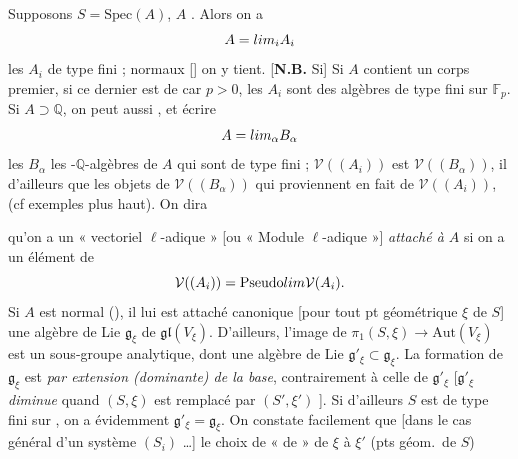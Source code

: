 \documentclass[11pt,a4paper]{article}
\begin{document}
Supposons $S = \mathrm{Spec}(A)$, $A$ 
 \struck{\ill{}} \struck{\ill{} \ill{} \ill{}}.
Alors on a
\[
A = \varinjlim_{i} A_{i}
\]
les $A_{i}$  de type fini ;
 normaux []  on y tient.
[\textbf{N.B.} Si] Si $A$ contient un corps premier, si ce dernier est de
car $p > 0$, les $A_{i}$ sont des algèbres de type fini sur
$\mathbb{F}_{p}$. Si $A \supset \mathbb{Q}$, on peut aussi \ill{}
\ill{}, et écrire
\[
A = \varinjlim_{\alpha} B_{\alpha}
\]
les $B_{\alpha}$ les -$\mathbb{Q}$-algèbres de $A$ qui sont
de type fini ; 
$\mathcal{V}((A_{i}))$ est   \ill{}
\ill{} $\mathcal{V}((B_{\alpha}))$, il  d'ailleurs que les
objets \struck{\ill{}} de $\mathcal{V}((B_{\alpha}))$ qui \ill{} \ill{}
 proviennent en fait de $\mathcal{V}((A_{i}))$, (cf
exemples plus haut). On dira

qu'on a un  « vectoriel $\ell$-adique » [ou « Module
$\ell$-adique »] \emph{attaché à $A$} si on a un élément de
\[
\mathcal{V}((A_{i})) = \text{Pseudo}\varinjlim \mathcal{V}(A_{i}).
\]
Si $A$ est normal (), il lui est attaché \struck{\ill{}}
canonique [pour tout pt géométrique $\xi$ de $S$] une algèbre de Lie
$\mathfrak{g}_{\xi}$ de $\mathfrak{gl}(V_{\xi})$. D'ailleurs, l'image de
$\pi_{1}(S, \xi) \to \mathrm{Aut}(V_{\xi})$ est un sous-groupe analytique,
dont une algèbre de Lie $\mathfrak{g}'_{\xi} \subset \mathfrak{g}_{\xi}$. La
formation de $\mathfrak{g}_{\xi}$ est 
\emph{ par extension (dominante) de la base},
contrairement à celle de $\mathfrak{g}'_{\xi}$ [$\mathfrak{g}'_{\xi}$
\emph{diminue} quand $(S, \xi)$ est remplacé par $(S', \xi')$
]. Si d'ailleurs $S$ est de type fini sur \ill{}, on a
évidemment $\mathfrak{g}'_{\xi} = \mathfrak{g}_{\xi}$. On constate
facilement que [dans le cas général d'un système $(S_{i})$ \ldots]
\struck{\ill{}} le choix de «  de  »
de $\xi$ à $\xi'$ \struck{\ill{}} (pts géom.\ de $S$) 
\end{document}
